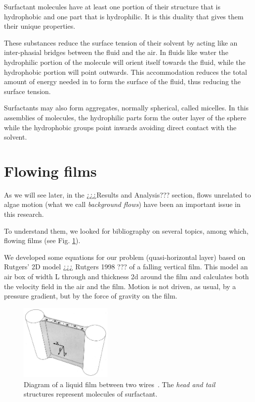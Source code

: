 Surfactant molecules have at least one portion of their structure that is hydrophobic and one part that is hydrophilic. It is this duality that gives them their unique properties.
 
These substances reduce the surface tension of their solvent by acting like an inter-phasial bridges between the fluid and the air. In fluids like water the hydrophilic portion of the molecule will orient itself towards the fluid, while the hydrophobic portion will point outwards. This accommodation reduces the total amount of energy needed in to form the surface of the fluid, thus reducing the surface tension.
 
Surfactants may also form aggregates, normally spherical, called micelles. In this assemblies of molecules, the hydrophilic parts form the outer layer of the sphere while the hydrophobic groups point inwards avoiding direct contact with the solvent.

\section{Flowing films}

As we will see later, in the ¿¿¿Results and Analysis??? section, flows unrelated to algae motion (what we call \textit{background flows}) have been an important issue in this research.

To understand them, we looked for bibliography on several topics, among which, flowing films (see Fig. \ref{flowing_film}).

We developed some equations for our problem (quasi-horizontal layer) based on Rutgers' 2D model ¿¿¿ Rutgers 1998 ??? of a falling vertical film. This model an air box of width L through and thickness 2d around the film and calculates both the velocity field in the air and the film. Motion is not driven, as usual, by a pressure gradient, but by the force of gravity on the film.

\begin{figure}[H]
	\centering
	\includegraphics[width=0.4\textwidth]{archivos/FilmBetweenWires.png}
	\caption{Diagram of a liquid film between two wires~\cite{Rutgers2001}. The \textit{head and tail} structures represent molecules of surfactant.}
	\label{flowing_film}
\end{figure}

